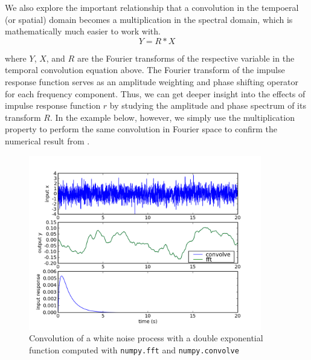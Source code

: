 We also explore the important relationship that a convolution in the
tempoeral (or spatial) domain becomes a multiplication in the spectral
domain, which is mathematically much easier to work with.  
\[
Y = R*X
\] 

where $Y$, $X$, and $R$ are the Fourier transforms of the respective
variable in the temporal convolution equation above.  The Fourier
transform of the impulse response function serves as an amplitude
weighting and phase shifting operator for each frequency component.
Thus, we can get deeper insight into the effects of impulse response
function $r$ by studying the amplitude and phase spectrum of its
transform $R$.  In the example below, however, we simply use the
multiplication property to perform the same convolution in Fourier
space to confirm the numerical result from .





\begin{center}%
\begin{figure}
\begin{centering}\includegraphics[width=4in]{fig/convolution_demo}\par\end{centering}
\caption{\label{fig:convolution_demo}Convolution of a white noise process with a double exponential function computed with \texttt{numpy.fft} and \texttt{numpy.convolve}}
\end{figure}
\par\end{center}
